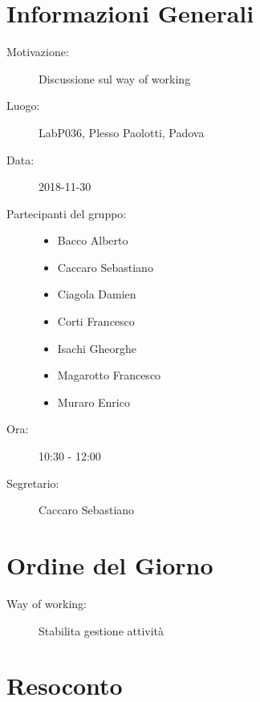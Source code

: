 \documentclass[a4paper, oneside, openany, dvipsnames, table]{article}
\begin{document}
\copertina{}


\newpage
\tableofcontents
\newpage

\section{Informazioni Generali}
\begin{description}
\item [Motivazione:] Discussione sul way of working
\item [Luogo:] LabP036, Plesso Paolotti, Padova
\item [Data:] 2018-11-30
\item [Partecipanti del gruppo:] \hfill
	\begin{itemize}
	\item Bacco Alberto
	\item Caccaro Sebastiano
	\item Ciagola Damien
	\item Corti Francesco
	\item Isachi Gheorghe
	\item Magarotto Francesco
	\item Muraro Enrico
	\end{itemize} 
\item [Ora:] 10:30 - 12:00
\item [Segretario:] Caccaro Sebastiano
\end{description}

\section{Ordine del Giorno}
\begin{description}
\item [Way of working: ] Stabilita gestione attività
\end{description}

\section{Resoconto}
\end{document}
